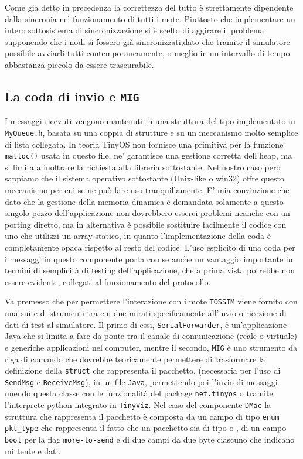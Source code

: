 \documentclass[twoside,11pt,a4paper,italian,openany]{book}
\newcommand{\tv}{\texttt{TinyViz}}
\newcommand{\tos}{\texttt{TOSSIM} }
\begin{document}
Come già detto in precedenza la correttezza del tutto è strettamente dipendente dalla sincronia 
nel funzionamento di tutti i mote. Piuttosto che implementare un intero sottosistema 
di sincronizzazione si è scelto di aggirare il problema supponendo che i nodi si fossero già 
sincronizzati,dato che  tramite il simulatore possibile avviarli tutti contemporaneamente,
 o meglio in un intervallo di tempo abbastanza piccolo da essere trascurabile. 

\subsection{La coda di invio e \texttt{MIG}}
I messaggi ricevuti vengono mantenuti in una struttura del tipo implementato in
 \texttt{MyQueue.h},
basata su una coppia di strutture e su un meccanismo molto semplice di lista collegata. 
In teoria TinyOS non fornisce una primitiva per la funzione \texttt{malloc()} usata in questo 
file, ne' garantisce una gestione corretta dell'heap, ma si limita a inoltrare la richiesta 
alla libreria sottostante.  Nel nostro caso però sappiamo che il sistema operativo sottostante 
(Unix-like o win32) offre questo meccanismo per cui se ne può fare uso tranquillamente. 
E' mia convinzione che dato che la gestione della memoria dinamica è demandata solamente a 
questo singolo pezzo dell'applicazione non dovrebbero esserci problemi neanche con un porting 
diretto, ma in alternativa è possibile sostituire facilmente il codice con uno che utilizzi un 
array statico, in quanto l'implementazione della coda è completamente opaca rispetto al 
resto del codice. 
L'uso esplicito di una coda per i messaggi in questo componente porta con se anche un 
vantaggio importante in termini di semplicità di testing dell'applicazione, che a prima vista 
potrebbe non essere evidente, collegati al funzionamento del protocollo. 

Va premesso che per permettere l'interazione con i mote \tos viene fornito con una suite di 
strumenti tra cui due mirati specificamente all'invio o ricezione di dati di test al simulatore. 
Il primo di essi, \texttt{SerialForwarder}, è un'applicazione Java che si limita a fare da ponte 
tra il canale di comunicazione (reale o virtuale) e generiche applicazioni nel computer, mentre 
il secondo, \texttt{MIG} è uno strumento da riga di comando che dovrebbe teoricamente 
permettere di trasformare la definizione della \texttt{struct} che rappresenta il pacchetto, 
(necessaria per l'uso di \texttt{SendMsg} e \texttt{ReceiveMsg}), in un file \texttt{Java}, 
permettendo poi l'invio di messaggi unendo questa classe con le  funzionalità del package 
\texttt{net.tinyos} o tramite l'interprete python integrato in \tv. 
Nel caso del componente \texttt{DMac} la struttura che rappresenta il pacchetto è composta da un campo di tipo \texttt{enum pkt\_type} che rappresenta il fatto che un pacchetto sia di 
tipo \req o \ack, di un campo \texttt{bool} 
per la flag \texttt{more-to-send} e di due campi da due byte ciascuno che indicano 
mittente e dati.
\end{document}

